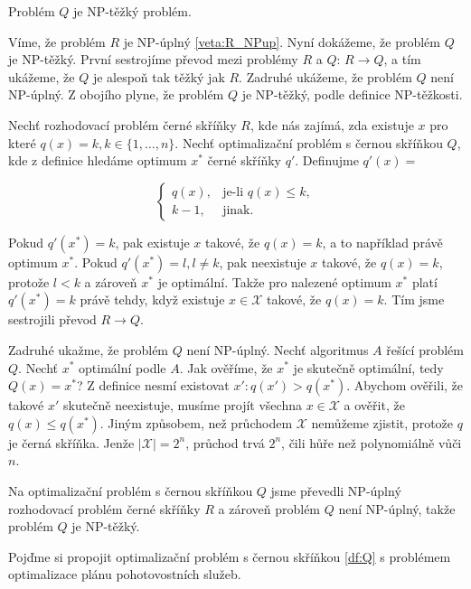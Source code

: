 \begin{veta}\label{veta:cernaSkrinkaNP}
  Problém $Q$ je NP-těžký problém.
\end{veta}

\begin{dukaz}
  Víme, že problém $R$ je NP-úplný \ref{veta:R_NPup}. Nyní dokážeme, že problém $Q$ je NP-těžký.
  První sestrojíme převod mezi problémy $R$ a $Q$: $R \rightarrow Q$, a tím ukážeme, že $Q$ je alespoň tak těžký jak $R$.
  Zadruhé ukážeme, že problém $Q$ není NP-úplný.
  Z obojího plyne, že problém $Q$ je NP-těžký, podle definice NP-těžkosti.

  Nechť rozhodovací problém černé skříňky $R$, kde nás zajímá, zda existuje $x$ pro které $q(x) = k, k \in \{ 1, \dots, n\}$. 
  Nechť optimalizační problém s černou skříňkou $Q$, kde z definice hledáme optimum $x^*$ černé skříňky $q'$.
  Definujme $q'(x) = $

  \[
  \begin{cases}
    q(x), & \text{je-li $q(x) \leq k$},\\
    k - 1, & \text{jinak}.
  \end{cases}
  \]

  Pokud $q'(x^*) = k$, pak existuje $x$ takové, že $q(x) = k$, a to například právě optimum $x^*$.
  Pokud $q'(x^*) = l, l \neq k$, pak neexistuje $x$ takové, že $q(x) = k$, protože $l < k$ a zároveň $x^*$ je optimální.
  Takže pro nalezené optimum $x^*$ platí $q'(x^*) = k$ právě tehdy, když existuje $x \in \mathcal{X}$ takové, že $q(x) = k$.
  Tím jsme sestrojili převod $R \rightarrow Q$.

  Zadruhé ukažme, že problém $Q$ není NP-úplný.
  Nechť algoritmus $A$ řešící problém $Q$.
  Nechť $x^*$ optimální podle $A$. Jak ověříme, že $x^*$ je skutečně optimální, tedy $Q(x) = x^*$?
  Z definice nesmí existovat $x' \colon q(x') > q(x^*)$.
  Abychom ověřili, že takové $x'$ skutečně neexistuje, musíme projít všechna $x \in \mathcal{X}$ a ověřit, že $q(x) \leq q(x^*)$.
  Jiným způsobem, než průchodem $\mathcal{X}$ nemůžeme zjistit, protože $q$ je černá skříňka.
  Jenže $|\mathcal{X}| = 2^n$, průchod trvá $2^n$, čili hůře než polynomiálně vůči $n$.

  Na optimalizační problém s černou skříňkou $Q$ jsme převedli NP-úplný rozhodovací problém černé skříňky $R$ a zároveň
  problém $Q$ není NP-úplný, takže problém $Q$ je NP-těžký.
\end{dukaz}

Pojďme si propojit optimalizační problém s černou skříňkou \ref{df:Q} s problémem optimalizace plánu pohotovostních služeb.


